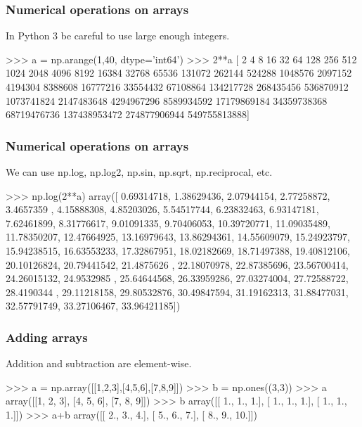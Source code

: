 \documentclass{beamer}
\begin{document}
\begin{frame}[fragile]
\frametitle{Numerical operations on arrays}
In Python 3 be careful to use large enough integers.
\begin{code}
>>> a = np.arange(1,40, dtype='int64')
>>> 2**a
[           2            4            8           16           32
  64          128          256          512         1024
  2048         4096         8192        16384        32768
  65536       131072       262144       524288      1048576
  2097152      4194304      8388608     16777216     33554432
  67108864    134217728    268435456    536870912   1073741824
  2147483648   4294967296   8589934592  17179869184  34359738368
  68719476736 137438953472 274877906944 549755813888]
\end{code}
\end{frame}

\begin{frame}[fragile]
\frametitle{Numerical operations on arrays}
We can use np.log, np.log2, np.sin, np.sqrt, np.reciprocal, etc.
\begin{code}
>>> np.log(2**a)
array([  0.69314718,   1.38629436,   2.07944154,   2.77258872,
         3.4657359 ,   4.15888308,   4.85203026,   5.54517744,
         6.23832463,   6.93147181,   7.62461899,   8.31776617,
         9.01091335,   9.70406053,  10.39720771,  11.09035489,
        11.78350207,  12.47664925,  13.16979643,  13.86294361,
        14.55609079,  15.24923797,  15.94238515,  16.63553233,
        17.32867951,  18.02182669,  18.71497388,  19.40812106,
        20.10126824,  20.79441542,  21.4875626 ,  22.18070978,
        22.87385696,  23.56700414,  24.26015132,  24.9532985 ,
        25.64644568,  26.33959286,  27.03274004,  27.72588722,
        28.4190344 ,  29.11218158,  29.80532876,  30.49847594,
        31.19162313,  31.88477031,  32.57791749,  33.27106467,  
        33.96421185])
\end{code}
\end{frame}

\begin{frame}[fragile]
\frametitle{Adding arrays}
Addition and subtraction are element-wise.
\begin{code}
>>> a = np.array([[1,2,3],[4,5,6],[7,8,9]])
>>> b = np.ones((3,3))
>>> a
array([[1, 2, 3],
       [4, 5, 6],
       [7, 8, 9]])
>>> b
array([[ 1.,  1.,  1.],
       [ 1.,  1.,  1.],
       [ 1.,  1.,  1.]])
>>> a+b
array([[  2.,   3.,   4.],
       [  5.,   6.,   7.],
       [  8.,   9.,  10.]])
\end{code}
\end{frame}
\end{document}

